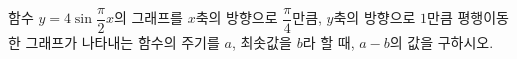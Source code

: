 함수 $y=4\sin\dfrac{\pi}{2}x$의 그래프를 $x$축의 방향으로 $\dfrac{\pi}{4}$만큼, $y$축의 방향으로 $1$만큼 평행이동한 그래프가 나타내는 함수의 주기를 $a$, 최솟값을 $b$라 할 때, $a-b$의 값을 구하시오.
